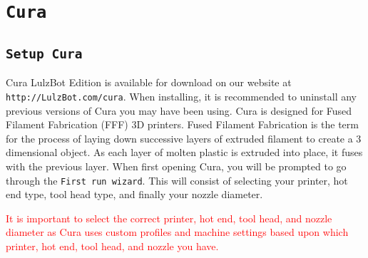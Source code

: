 %
%
%
%
%

\section{\texttt{Cura}}
\label{Cura}

\subsection{\texttt{Setup Cura}}
Cura LulzBot Edition is available for download on our website at \texttt{http://LulzBot.com/cura}. When installing, it is recommended to uninstall any previous versions of Cura you may have been using. Cura is designed for Fused Filament Fabrication (FFF) 3D printers. Fused Filament Fabrication is the term for the process of laying down successive layers of extruded filament to create a 3 dimensional object. As each layer of molten plastic is extruded into place, it fuses with the previous layer.
When first opening Cura, you will be prompted to go through the \texttt{First run wizard}. This will consist of selecting your printer, hot end type, tool head type, and finally your nozzle diameter.

\textcolor{red}{It is important to select the correct printer, hot end, tool head, and nozzle diameter as Cura uses custom profiles and machine settings based upon which printer, hot end, tool head, and nozzle you have.}


